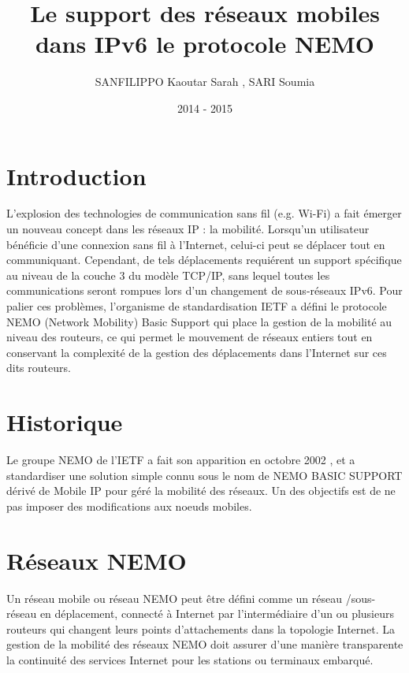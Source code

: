 \documentclass[12pt]{article}
\title{Le support des r\'{e}seaux mobiles dans IPv6
           le protocole NEMO }
\author{SANFILIPPO Kaoutar Sarah , SARI Soumia}
\date{2014 - 2015}
\begin{document}
\maketitle
\newpage
\renewcommand{\contentsname}{Sommaire}
\tableofcontents

\newpage
\section{Introduction}

L'explosion des technologies de communication sans fil (e.g. Wi-Fi) a fait \'{e}merger un nouveau
concept dans les r\'{e}seaux IP : la mobilit\'{e}. Lorsqu'un utilisateur b\'{e}n\'{e}ficie d'une connexion sans fil \`a
l'Internet, celui-ci peut se d\'{e}placer tout en communiquant. Cependant, de tels d\'{e}placements
requi\'{e}rent un support sp\'{e}cifique au niveau de la couche 3 du mod\`{e}le TCP/IP, sans lequel toutes les
communications seront rompues lors d'un changement de sous-r\'{e}seaux IPv6. Pour palier ces
probl\`{e}mes, l'organisme de standardisation IETF a d\'{e}fini le protocole NEMO (Network Mobility) Basic
Support qui place la gestion de la mobilit\'{e} au niveau des routeurs, ce qui permet le mouvement de
r\'{e}seaux entiers tout en conservant la complexit\'{e} de la gestion des d\'{e}placements dans l'Internet sur
ces dits routeurs.

\section{Historique}

Le groupe NEMO de l'IETF a fait son apparition en octobre 2002 , et a standardiser une solution simple connu sous
le nom de NEMO BASIC SUPPORT d\'eriv\'e de Mobile IP pour g\'er\'e la mobilit\'e des r\'eseaux.
Un des objectifs est de ne pas imposer des modifications aux noeuds mobiles.
 
\section{R\'eseaux NEMO}
Un r\'eseau mobile ou r\'eseau NEMO peut \^etre d\'efini comme un r\'eseau /sous-r\'eseau en d\'eplacement, connect\'e \`a Internet par l'interm\'ediaire d'un ou plusieurs routeurs qui changent leurs points d'attachements dans la topologie Internet. La gestion de la mobilit\'e des r\'eseaux NEMO doit assurer d'une mani\`ere transparente la continuit\'e des services Internet  pour les stations ou terminaux embarqu\'e.
\end{document}
